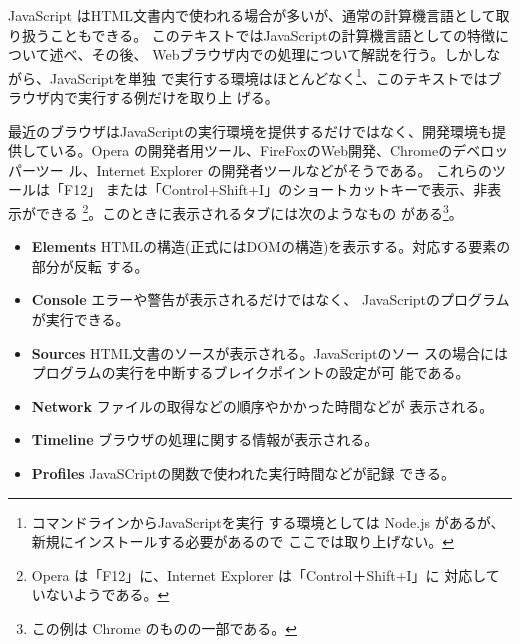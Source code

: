 JavaScript はHTML文書内で使われる場合が多いが、通常の計算機言語として取
り扱うこともできる。
このテキストではJavaScriptの計算機言語としての特徴について述べ、その後、
Webブラウザ内での処理について解説を行う。しかしながら、JavaScriptを単独
で実行する環境はほとんどなく\footnote{コマンドラインからJavaScriptを実行
する環境としては Node.js があるが、新規にインストールする必要があるので
ここでは取り上げない。}、このテキストではブラウザ内で実行する例だけを取り上
げる。

最近のブラウザはJavaScriptの実行環境を提供するだけではなく、開発環境も提
供している。Opera の開発者用ツール、FireFoxのWeb開発、Chromeのデベロッパーツー
ル、Internet Explorer の開発者ツールなどがそうである。
これらのツールは「F12」
または「Control+Shift+I」のショートカットキーで表示、非表示ができる
\footnote{Opera は「F12」に、Internet Explorer は「Control＋Shift+I」に
対応していないようである。}。このときに表示されるタブには次のようなもの
がある\footnote{この例は Chrome のものの一部である。}。
\begin{itemize}
 \item {\bfseries Elements }
       HTMLの構造(正式にはDOMの構造)を表示する。対応する要素の部分が反転
       する。
 \item {\bfseries Console }エラーや警告が表示されるだけではなく、
       JavaScriptのプログラムが実行できる。
 \item {\bfseries Sources }HTML文書のソースが表示される。JavaScriptのソー
       スの場合にはプログラムの実行を中断するブレイクポイントの設定が可
       能である。
 \item {\bfseries Network }ファイルの取得などの順序やかかった時間などが
       表示される。
 \item {\bfseries Timeline }ブラウザの処理に関する情報が表示される。
 \item {\bfseries Profiles }JavaSCriptの関数で使われた実行時間などが記録
       できる。
\end{itemize}